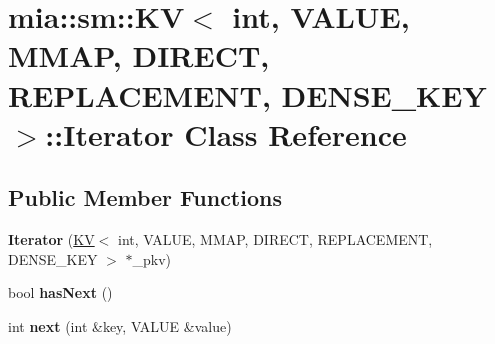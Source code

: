 \hypertarget{classmia_1_1sm_1_1_k_v_3_01int_00_01_v_a_l_u_e_00_01_m_m_a_p_00_01_d_i_r_e_c_t_00_01_r_e_p_l_a_c777ddd58bcfb92c8593dd8ce3d26b512}{\section{mia\-:\-:sm\-:\-:K\-V$<$ int, V\-A\-L\-U\-E, M\-M\-A\-P, D\-I\-R\-E\-C\-T, R\-E\-P\-L\-A\-C\-E\-M\-E\-N\-T, D\-E\-N\-S\-E\-\_\-\-K\-E\-Y $>$\-:\-:Iterator Class Reference}
\label{classmia_1_1sm_1_1_k_v_3_01int_00_01_v_a_l_u_e_00_01_m_m_a_p_00_01_d_i_r_e_c_t_00_01_r_e_p_l_a_c777ddd58bcfb92c8593dd8ce3d26b512}
}
\subsection*{Public Member Functions}
\begin{DoxyCompactItemize}
\item 
\hypertarget{classmia_1_1sm_1_1_k_v_3_01int_00_01_v_a_l_u_e_00_01_m_m_a_p_00_01_d_i_r_e_c_t_00_01_r_e_p_l_a_c777ddd58bcfb92c8593dd8ce3d26b512_ad3f806519f2d6a7640f652e4d1b622e6}{{\bfseries Iterator} (\hyperlink{classmia_1_1sm_1_1_k_v}{K\-V}$<$ int, V\-A\-L\-U\-E, M\-M\-A\-P, D\-I\-R\-E\-C\-T, R\-E\-P\-L\-A\-C\-E\-M\-E\-N\-T, D\-E\-N\-S\-E\-\_\-\-K\-E\-Y $>$ $\ast$\-\_\-pkv)}\label{classmia_1_1sm_1_1_k_v_3_01int_00_01_v_a_l_u_e_00_01_m_m_a_p_00_01_d_i_r_e_c_t_00_01_r_e_p_l_a_c777ddd58bcfb92c8593dd8ce3d26b512_ad3f806519f2d6a7640f652e4d1b622e6}

\item 
\hypertarget{classmia_1_1sm_1_1_k_v_3_01int_00_01_v_a_l_u_e_00_01_m_m_a_p_00_01_d_i_r_e_c_t_00_01_r_e_p_l_a_c777ddd58bcfb92c8593dd8ce3d26b512_a4ce237d6811b6dfc2d3bc68156e7109c}{bool {\bfseries has\-Next} ()}\label{classmia_1_1sm_1_1_k_v_3_01int_00_01_v_a_l_u_e_00_01_m_m_a_p_00_01_d_i_r_e_c_t_00_01_r_e_p_l_a_c777ddd58bcfb92c8593dd8ce3d26b512_a4ce237d6811b6dfc2d3bc68156e7109c}

\item 
\hypertarget{classmia_1_1sm_1_1_k_v_3_01int_00_01_v_a_l_u_e_00_01_m_m_a_p_00_01_d_i_r_e_c_t_00_01_r_e_p_l_a_c777ddd58bcfb92c8593dd8ce3d26b512_a80c090e9a355b3bfadad5636a531f0d6}{int {\bfseries next} (int \&key, V\-A\-L\-U\-E \&value)}\label{classmia_1_1sm_1_1_k_v_3_01int_00_01_v_a_l_u_e_00_01_m_m_a_p_00_01_d_i_r_e_c_t_00_01_r_e_p_l_a_c777ddd58bcfb92c8593dd8ce3d26b512_a80c090e9a355b3bfadad5636a531f0d6}

\end{DoxyCompactItemize}
